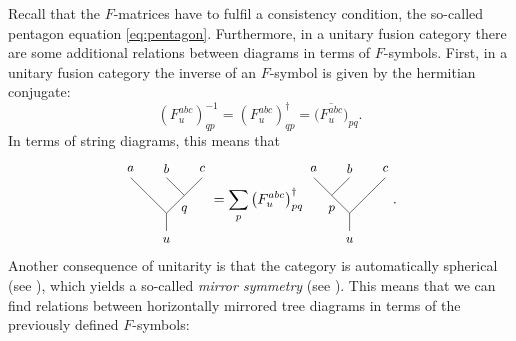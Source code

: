 Recall that the $F$-matrices have to fulfil a consistency condition, the so-called pentagon equation \cref{eq:pentagon}. Furthermore, in a unitary fusion category there are some additional relations between diagrams in terms of $F$-symbols. First, in a unitary fusion category the inverse of an $F$-symbol is given by the hermitian conjugate:
	\begin{equation}
		\left(F_u^{abc}\right)_{qp}^{-1}=\left(F_u^{abc}\right)_{qp}^\dagger=\overline{\Big(F_u^{abc}\Big)}_{pq}.
	\end{equation}
In terms of string diagrams, this means that
	\begin{equation}
		\begin{tikzpicture}[baseline=(current bounding box.center),yscale=0.9,xscale=0.9]
			\draw (0,0.5) -- (0,1);
			\draw (0,1) -- (-0.5,1.5);
			\draw (-0.5,1.5) -- (-1,2);
			\draw (0.5,1.5) -- (0,2);
			\draw (0,1) -- (0.5,1.5);
			\draw (0.5,1.5) -- (1,2);
			\node at (0,0.25) {\small $u$};
			\node at (-1,2.25) {\small $a$};
			\node at (0,2.25) {\small $b$};
			\node at (1,2.25) {\small $c$};
			\node at (0.5,1.1) {\small $q$};
		\end{tikzpicture}=\sum_p \left(F_u^{abc}\right)_{pq}^\dagger
		\begin{tikzpicture}[baseline=(current bounding box.center),yscale=0.9,xscale=0.9]
			\draw (0,0.5) -- (0,1);
			\draw (0,1) -- (-0.5,1.5);
			\draw (-0.5,1.5) -- (-1,2);
			\draw (-0.5,1.5) -- (0,2);
			\draw (0,1) -- (0.5,1.5);
			\draw (0.5,1.5) -- (1,2);
			\node at (0,0.25) {\small $u$};
			\node at (-1,2.25) {\small $a$};
			\node at (0,2.25) {\small $b$};
			\node at (1,2.25) {\small $c$};
			\node at (-0.5,1.1) {\small $p$};
		\end{tikzpicture}.
	\end{equation}
Another consequence of unitarity is that the category is automatically spherical (see \cite[Proposition 8.23]{Etingof2005}), which yields a so-called \emph{mirror symmetry} (see \cite{Hong2009}). This means that we can find relations between horizontally mirrored tree diagrams in terms of the previously defined $F$-symbols:
